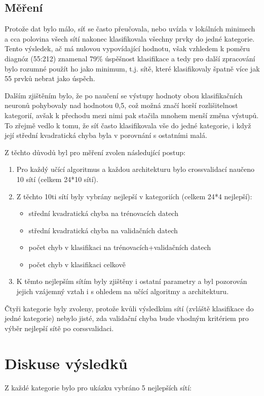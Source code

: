 \documentclass[journal]{IEEEtrancz}
\begin{document}
\subsection{Měření}
Protože dat bylo málo, síť se často přeučovala, nebo uvízla v lokálních minimech a cca polovina všech sítí nakonec klasifikovala všechny prvky do jedné kategorie. Tento výsledek, ač má nulovou vypovídající hodnotu, však vzhledem k poměru diagnóz (55:212) znamenal 79\% úspěšnost klasifikace a tedy pro další zpracování bylo rozumné použít ho jako minimum, t.j. sítě, které klasifikovaly špatně více jak 55 prvků nebrat jako úspěch.

Dalším zjištěním bylo, že po naučení se výstupy hodnoty obou klasifikačních neuronů pohybovaly nad hodnotou 0,5, což možná značí horší rozlišitelnost kategorií, avšak k přechodu mezi nimi pak stačila mnohem menší změna výstupů. To zřejmě vedlo k tomu, že síť často klasifikovala vše do jedné kategorie, i když její střední kvadratická chyba byla v porovnání s ostatními malá.

Z těchto důvodů byl pro měření zvolen následující postup:
\begin{enumerate}
    \item Pro každý učící algoritmus a každou architekturu bylo crossvalidací naučeno 10 sítí (celkem 24*10 sítí).
    \item Z těchto 10ti sítí byly vybrány nejlepší v kategoriích (celkem 24*4 nejlepší): 
        \begin{itemize}
          \item střední kvadratická chyba na trénovacích datech
          \item střední kvadratická chyba na validačních datech
          \item počet chyb v klasifikaci na trénovacích+validačních datech
          \item počet chyb v klasifikaci celkově
        \end{itemize}
    \item K těmto nejlepším sítím byly zjištěny i ostatní parametry a byl pozorován jejich vzájemný vztah i s ohledem na učící algoritmy a architekturu.
\end{enumerate}
Čtyři kategorie byly zvoleny, protože kvůli výsledkům sítí (zvláště klasifikace do jedné kategorie) nebylo jisté, zda validační chyba bude vhodným kritériem pro výběr nejlepší sítě po corssvalidaci.

\section{Diskuse výsledků}
Z každé kategorie bylo pro ukázku vybráno 5 nejlepších sítí:
\end{document}

